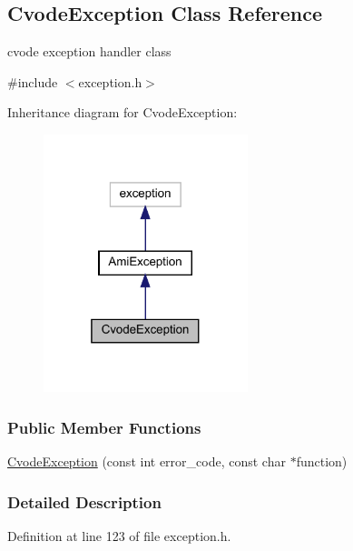 \hypertarget{classamici_1_1_cvode_exception}{}\subsection{Cvode\+Exception Class Reference}
\label{classamici_1_1_cvode_exception}


cvode exception handler class  




{\ttfamily \#include $<$exception.\+h$>$}



Inheritance diagram for Cvode\+Exception\+:
\nopagebreak
\begin{figure}[H]
\begin{center}
\leavevmode
\includegraphics[width=169pt]{classamici_1_1_cvode_exception__inherit__graph}
\end{center}
\end{figure}
\subsubsection*{Public Member Functions}
\begin{DoxyCompactItemize}
\item 
\mbox{\hyperlink{classamici_1_1_cvode_exception_ac93a5dc0529238779b716b7a30cf69cb}{Cvode\+Exception}} (const int error\+\_\+code, const char $\ast$function)
\end{DoxyCompactItemize}


\subsubsection{Detailed Description}


Definition at line 123 of file exception.\+h.



